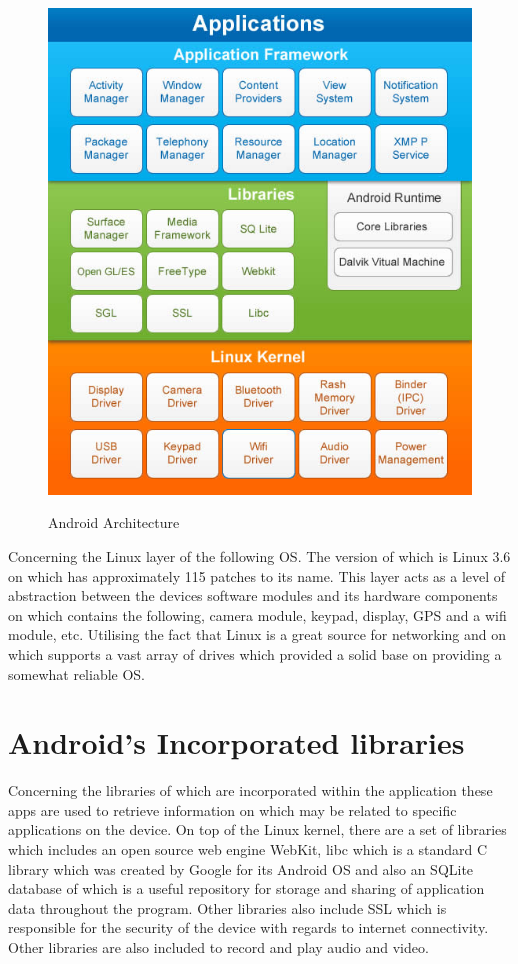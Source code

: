 \begin{figure}[htbp]
    \center \includegraphics[width=400pt]{AndroidOS}\\
    \caption{Android Architecture \citep{androidlife}} \label{Figure: Android Architecture}
\end{figure}
\par 
Concerning the Linux layer of the following OS. The version of which is Linux 3.6 on which has approximately 115 patches to its name. This layer acts as a level of abstraction between the devices software modules and its hardware components on which contains the following, camera module, keypad, display, GPS and a wifi module, etc. Utilising the fact that Linux is a great source for networking and on which supports a vast array of drives which provided a solid base on providing a somewhat reliable OS.

\section{Android's Incorporated libraries}
Concerning the libraries of which are incorporated within the application these apps are used to retrieve information on which may be related to specific applications on the device. On top of the Linux kernel, there are a set of libraries which includes an open source web engine WebKit, libc which is a standard C library which was created by Google for its Android OS and also an SQLite database of which is a useful repository for storage and sharing of application data throughout the program. Other libraries also include SSL which is responsible for the security of the device with regards to internet connectivity. Other libraries are also included to record and play audio and video.
